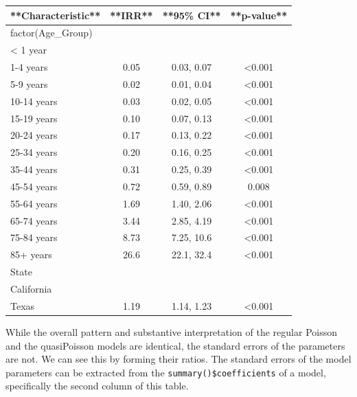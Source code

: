 \documentclass[
]{article}
\begin{document}
\begin{tabular}{l|c|c|c}
\hline
**Characteristic** & **IRR** & **95\% CI** & **p-value**\\
\hline
factor(Age\_Group) &  &  & \\
\hline
< 1 year &  &  & \\
\hline
1-4 years & 0.05 & 0.03, 0.07 & <0.001\\
\hline
5-9 years & 0.02 & 0.01, 0.04 & <0.001\\
\hline
10-14 years & 0.03 & 0.02, 0.05 & <0.001\\
\hline
15-19 years & 0.10 & 0.07, 0.13 & <0.001\\
\hline
20-24 years & 0.17 & 0.13, 0.22 & <0.001\\
\hline
25-34 years & 0.20 & 0.16, 0.25 & <0.001\\
\hline
35-44 years & 0.31 & 0.25, 0.39 & <0.001\\
\hline
45-54 years & 0.72 & 0.59, 0.89 & 0.008\\
\hline
55-64 years & 1.69 & 1.40, 2.06 & <0.001\\
\hline
65-74 years & 3.44 & 2.85, 4.19 & <0.001\\
\hline
75-84 years & 8.73 & 7.25, 10.6 & <0.001\\
\hline
85+ years & 26.6 & 22.1, 32.4 & <0.001\\
\hline
State &  &  & \\
\hline
California &  &  & \\
\hline
Texas & 1.19 & 1.14, 1.23 & <0.001\\
\hline
\end{tabular}

While the overall pattern and substantive interpretation of the regular Poisson and the quasiPoisson models are identical, the standard errors of the parameters are not. We can see this by forming their ratios. The standard errors of the model parameters can be extracted from the \texttt{summary()\$coefficients} of a model, specifically the second column of this table.
\end{document}
